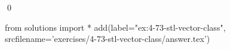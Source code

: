 
\begin{ex}
  \label{ex:4-73-stl-vector-class}
  
  \qed
\end{ex}
\begin{python0}
from solutions import *
add(label="ex:4-73-stl-vector-class",
    srcfilename='exercises/4-73-stl-vector-class/answer.tex')
\end{python0}
